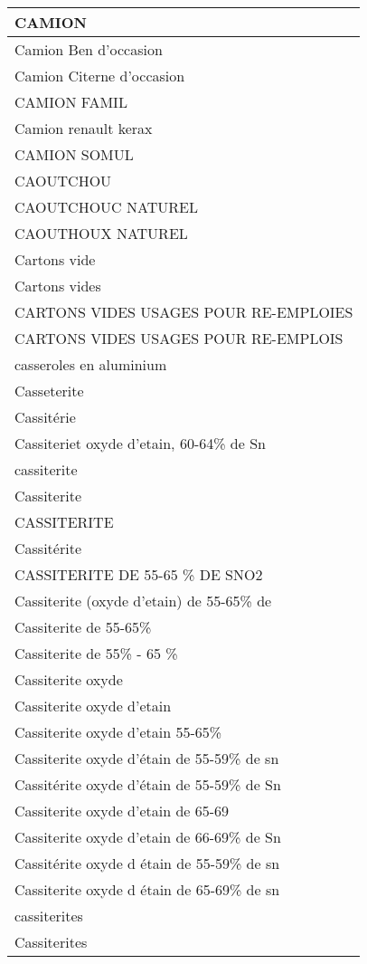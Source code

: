 \documentclass[
]{book}
\begin{document}
\begin{table}
\begin{tabular}[t]{l}
\hline
CAMION\\
\hline
Camion Ben d'occasion\\
\hline
Camion Citerne d'occasion\\
\hline
CAMION FAMIL\\
\hline
Camion renault kerax\\
\hline
CAMION SOMUL\\
\hline
CAOUTCHOU\\
\hline
CAOUTCHOUC NATUREL\\
\hline
CAOUTHOUX NATUREL\\
\hline
Cartons vide\\
\hline
Cartons vides\\
\hline
CARTONS VIDES USAGES POUR RE-EMPLOIES\\
\hline
CARTONS VIDES USAGES POUR RE-EMPLOIS\\
\hline
casseroles en aluminium\\
\hline
Casseterite\\
\hline
Cassitérie\\
\hline
Cassiteriet oxyde d'etain, 60-64\% de Sn\\
\hline
cassiterite\\
\hline
Cassiterite\\
\hline
CASSITERITE\\
\hline
Cassitérite\\
\hline
CASSITERITE  DE 55-65 \% DE SNO2\\
\hline
Cassiterite (oxyde d'etain) de 55-65\% de\\
\hline
Cassiterite de 55-65\%\\
\hline
Cassiterite de 55\% - 65 \%\\
\hline
Cassiterite oxyde\\
\hline
Cassiterite oxyde d'etain\\
\hline
Cassiterite oxyde d'etain 55-65\%\\
\hline
Cassiterite oxyde d'étain de 55-59\% de sn\\
\hline
Cassitérite oxyde d'étain de 55-59\% de Sn\\
\hline
Cassiterite oxyde d'etain de 65-69\\
\hline
Cassiterite oxyde d'etain de 66-69\% de Sn\\
\hline
Cassitérite oxyde d étain de 55-59\% de sn\\
\hline
Cassiterite oxyde d étain de 65-69\% de sn\\
\hline
cassiterites\\
\hline
Cassiterites\\

\end{tabular}
\end{table}
\end{document}
